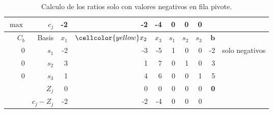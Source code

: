 \documentclass[letter]{article}
\begin{document}
      \begin{table}[h]
    \caption{Calculo de los ratios solo con valores negativos en fila pivote.}
        \centering
    \begin{tabular}{rrrrrrrrrr}
      \toprule
      $\max$&$c_j$&-2&-2&-4&0&0&0&\\
      \midrule
      $C_b$&Basis&$x_1$&$\cellcolor{yellow}x_2$&$x_3$&$s_1$&$s_2$&$s_3$&$\pmb{b}$&\\
      \midrule
      0&$s_1$&\cellcolor{blue!30}-2&\cellcolor{blue!30}-3&\cellcolor{blue!30}-5&1&0&0&-2& solo negativos\\
      0&$s_2$&3&1&7&0&1&0&3&\\
      0&$s_3$&1&4&6&0&0&1&5&\\
      \midrule
      &$Z_j$&0&0&0&0&0&0&\textbf{0}&\\
      &$c_j - Z_j$&\cellcolor{blue!30}-2&\cellcolor{blue!30}-2&\cellcolor{blue!30}-4&0&0&0&\\
      \bottomrule
    \end{tabular}
  \end{table}
  
\end{document}
